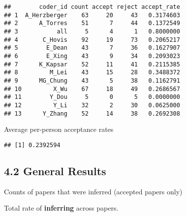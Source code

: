 \documentclass[
]{article}
\newenvironment{Shaded}{\begin{snugshade}}{\end{snugshade}}
\newcommand{\CommentTok}[1]{\textcolor[rgb]{0.56,0.35,0.01}{\textit{#1}}}
\newcommand{\KeywordTok}[1]{\textcolor[rgb]{0.13,0.29,0.53}{\textbf{#1}}}
\newcommand{\NormalTok}[1]{#1}
\newcommand{\OperatorTok}[1]{\textcolor[rgb]{0.81,0.36,0.00}{\textbf{#1}}}
\newcommand{\StringTok}[1]{\textcolor[rgb]{0.31,0.60,0.02}{#1}}
\begin{document}
\begin{verbatim}
##        coder_id count accept reject accept_rate
## 1  A_Herzberger    63     20     43   0.3174603
## 2      A_Torres    51      7     44   0.1372549
## 3           all     5      4      1   0.8000000
## 4       C_Hovis    92     19     73   0.2065217
## 5        E_Dean    43      7     36   0.1627907
## 6        E_Xing    43      9     34   0.2093023
## 7      K_Kapsar    52     11     41   0.2115385
## 8         M_Lei    43     15     28   0.3488372
## 9      MG_Chung    43      5     38   0.1162791
## 10         X_Wu    67     18     49   0.2686567
## 11        Y_Dou     5      0      5   0.0000000
## 12         Y_Li    32      2     30   0.0625000
## 13      Y_Zhang    52     14     38   0.2692308
\end{verbatim}

Average per-person acceptance rates

\begin{Shaded}
\end{Shaded}

\begin{verbatim}
## [1] 0.2392594
\end{verbatim}

\hypertarget{general-results}{%
\subsection{4.2 General Results}\label{general-results}}

Counts of papers that were inferred (accepted papers only)

Total rate of \textbf{inferring} across papers.

\begin{Shaded}
\end{Shaded}
\end{document}
